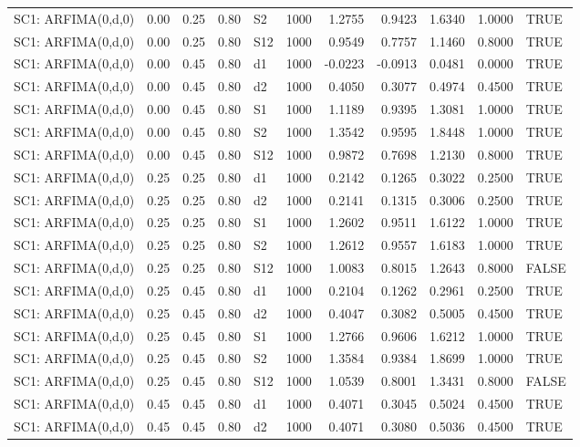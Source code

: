 \begin{table}[ht]
\begin{tabular}{lrrrlrrrrrl}
  SC1: ARFIMA(0,d,0) & 0.00 & 0.25 & 0.80 & S2 & 1000 & 1.2755 & 0.9423 & 1.6340 & 1.0000 & TRUE \\ 
  SC1: ARFIMA(0,d,0) & 0.00 & 0.25 & 0.80 & S12 & 1000 & 0.9549 & 0.7757 & 1.1460 & 0.8000 & TRUE \\ 
  SC1: ARFIMA(0,d,0) & 0.00 & 0.45 & 0.80 & d1 & 1000 & -0.0223 & -0.0913 & 0.0481 & 0.0000 & TRUE \\ 
  SC1: ARFIMA(0,d,0) & 0.00 & 0.45 & 0.80 & d2 & 1000 & 0.4050 & 0.3077 & 0.4974 & 0.4500 & TRUE \\ 
  SC1: ARFIMA(0,d,0) & 0.00 & 0.45 & 0.80 & S1 & 1000 & 1.1189 & 0.9395 & 1.3081 & 1.0000 & TRUE \\ 
  SC1: ARFIMA(0,d,0) & 0.00 & 0.45 & 0.80 & S2 & 1000 & 1.3542 & 0.9595 & 1.8448 & 1.0000 & TRUE \\ 
  SC1: ARFIMA(0,d,0) & 0.00 & 0.45 & 0.80 & S12 & 1000 & 0.9872 & 0.7698 & 1.2130 & 0.8000 & TRUE \\ 
  SC1: ARFIMA(0,d,0) & 0.25 & 0.25 & 0.80 & d1 & 1000 & 0.2142 & 0.1265 & 0.3022 & 0.2500 & TRUE \\ 
  SC1: ARFIMA(0,d,0) & 0.25 & 0.25 & 0.80 & d2 & 1000 & 0.2141 & 0.1315 & 0.3006 & 0.2500 & TRUE \\ 
  SC1: ARFIMA(0,d,0) & 0.25 & 0.25 & 0.80 & S1 & 1000 & 1.2602 & 0.9511 & 1.6122 & 1.0000 & TRUE \\ 
  SC1: ARFIMA(0,d,0) & 0.25 & 0.25 & 0.80 & S2 & 1000 & 1.2612 & 0.9557 & 1.6183 & 1.0000 & TRUE \\ 
  SC1: ARFIMA(0,d,0) & 0.25 & 0.25 & 0.80 & S12 & 1000 & 1.0083 & 0.8015 & 1.2643 & 0.8000 & FALSE \\ 
  SC1: ARFIMA(0,d,0) & 0.25 & 0.45 & 0.80 & d1 & 1000 & 0.2104 & 0.1262 & 0.2961 & 0.2500 & TRUE \\ 
  SC1: ARFIMA(0,d,0) & 0.25 & 0.45 & 0.80 & d2 & 1000 & 0.4047 & 0.3082 & 0.5005 & 0.4500 & TRUE \\ 
  SC1: ARFIMA(0,d,0) & 0.25 & 0.45 & 0.80 & S1 & 1000 & 1.2766 & 0.9606 & 1.6212 & 1.0000 & TRUE \\ 
  SC1: ARFIMA(0,d,0) & 0.25 & 0.45 & 0.80 & S2 & 1000 & 1.3584 & 0.9384 & 1.8699 & 1.0000 & TRUE \\ 
  SC1: ARFIMA(0,d,0) & 0.25 & 0.45 & 0.80 & S12 & 1000 & 1.0539 & 0.8001 & 1.3431 & 0.8000 & FALSE \\ 
  SC1: ARFIMA(0,d,0) & 0.45 & 0.45 & 0.80 & d1 & 1000 & 0.4071 & 0.3045 & 0.5024 & 0.4500 & TRUE \\ 
  SC1: ARFIMA(0,d,0) & 0.45 & 0.45 & 0.80 & d2 & 1000 & 0.4071 & 0.3080 & 0.5036 & 0.4500 & TRUE \\ 

\end{tabular}
\end{table}
